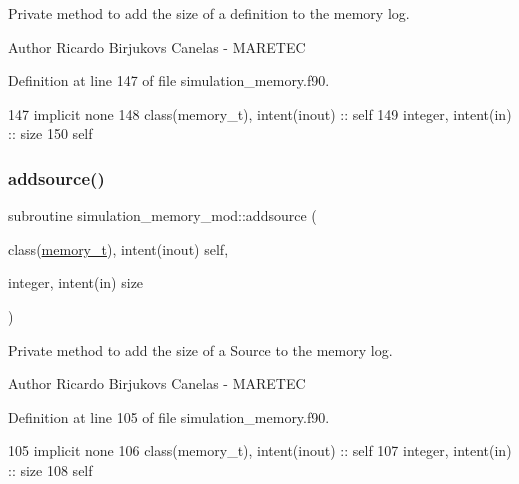 Private method to add the size of a definition to the memory log. 

\begin{DoxyAuthor}{Author}
Ricardo Birjukovs Canelas -\/ M\+A\+R\+E\+T\+EC 
\end{DoxyAuthor}


Definition at line 147 of file simulation\+\_\+memory.\+f90.


\begin{DoxyCode}
147     \textcolor{keywordtype}{implicit none}
148     \textcolor{keywordtype}{class}(memory\_t), \textcolor{keywordtype}{intent(inout)} :: self
149     \textcolor{keywordtype}{integer}, \textcolor{keywordtype}{intent(in)} :: size
150     self%
\end{DoxyCode}
\mbox{\label{namespacesimulation__memory__mod_a940ff42fa3a49423f9ac98da2bffa54c}} 
\subsubsection{\texorpdfstring{addsource()}{addsource()}}
{\footnotesize\ttfamily subroutine simulation\+\_\+memory\+\_\+mod\+::addsource (\begin{DoxyParamCaption}\item[{class(\mbox{\hyperlink{structsimulation__memory__mod_1_1memory__t}{memory\+\_\+t}}), intent(inout)}]{self,  }\item[{integer, intent(in)}]{size }\end{DoxyParamCaption})\hspace{0.3cm}{\ttfamily [private]}}



Private method to add the size of a Source to the memory log. 

\begin{DoxyAuthor}{Author}
Ricardo Birjukovs Canelas -\/ M\+A\+R\+E\+T\+EC 
\end{DoxyAuthor}


Definition at line 105 of file simulation\+\_\+memory.\+f90.


\begin{DoxyCode}
105     \textcolor{keywordtype}{implicit none}
106     \textcolor{keywordtype}{class}(memory\_t), \textcolor{keywordtype}{intent(inout)} :: self
107     \textcolor{keywordtype}{integer}, \textcolor{keywordtype}{intent(in)} :: size
108     self%
\end{DoxyCode}
\mbox{\label{namespacesimulation__memory__mod_a5770021491589bbd61ea112d113a9c9d}} 
